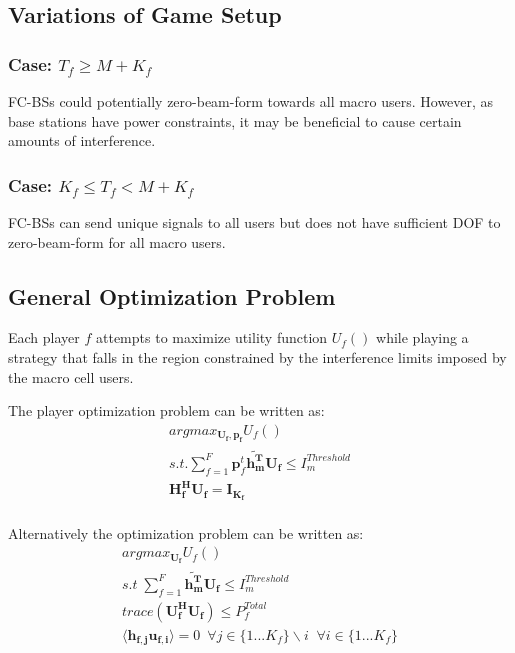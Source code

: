 \documentclass[12pt]{article}
\begin{document}
\subsection{Variations of Game Setup}

\subsubsection{Case: $T_f \geq M + K_f$}
FC-BSs could potentially zero-beam-form towards all macro users. However, as base stations have power constraints, it may be beneficial to cause certain amounts of interference. 

\subsubsection{Case: $K_f \leq T_f < M + K_f$}
FC-BSs can send unique signals to all users but does not have sufficient DOF to zero-beam-form for all macro users.


\subsection{General Optimization Problem}

Each player $f$ attempts to maximize utility function $U_f()$ while playing a strategy that falls in the region constrained by the interference limits imposed by the macro cell users.

The player optimization problem can be written as:
\\

\begin{gather*} 
argmax_{\mathbf{U_f,\mathbf{p}_f}} U_f() 
\\
s.t. \sum^F_{f=1} \mathbf{p}_f^t \mathbf{\tilde{h_m^T}}  \mathbf{U_f}  \leq I^{Threshold}_{m} 
\\
\mathbf{H_f^H}\mathbf{U_f} = \mathbf{I_{K_f}}
\end{gather*}
\\

Alternatively the optimization problem can be written as:
\\

\begin{gather} 
argmax_{\mathbf{U_f}} U_f()\label{utility}
\\
s.t \; \sum^F_{f=1} \mathbf{\tilde{h_m^T}}  \mathbf{U_f}  \leq I^{Threshold}_{m} \label{interference_contstraint}
\\
trace(\mathbf{U_f^H}\mathbf{U_f}) \leq P^{Total}_{f} \label{power_constraint}
\\
\langle \mathbf{h_{f,j}}\mathbf{u_{f,i}} \rangle =0\ \; \forall j \in \{1 ... K_f\}\backslash i \;\; \forall i \in \{1 ... K_f\} \label{Zero_Forcing}
\end{gather}
\\
\end{document}
